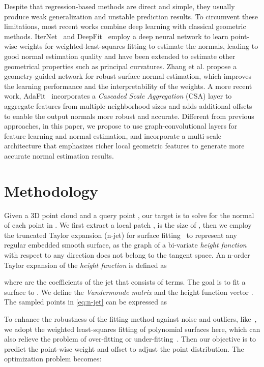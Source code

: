 \documentclass[runningheads]{llncs}
\begin{document}
 Despite that regression-based methods
are direct and simple, they usually produce weak generalization and unstable prediction results. To circumvent these limitations, most recent works combine deep learning with classical geometric methods. IterNet~\cite{lenssen2020deep} and DeepFit~\cite{ben2020deepfit} employ a deep neural network to learn point-wise weights for weighted-least-squares fitting to estimate the normals, leading to good normal estimation quality and have been extended to estimate other geometrical properties such as principal curvatures. Zhang et al. \cite{zhang2022geometry} propose a geometry-guided network for robust surface normal estimation, which improves the learning performance and the interpretability of the weights. A more recent work, AdaFit~\cite{zhu2021adafit} incorporates a \emph{Cascaded Scale Aggregation} (CSA) layer to aggregate features from multiple neighborhood sizes and adds additional offsets to enable the output normals more robust and accurate. Different from previous approaches, in this paper, we propose to use graph-convolutional layers for feature learning and normal estimation, and incorporate a multi-scale architecture that emphasizes richer local geometric features to generate more accurate normal estimation results.


\section{Methodology}\label{sec:meth}
 Given a 3D point cloud  and a query point , our target is to solve for the normal of each point in . We first extract a local patch ,  is the size of , then we employ the truncated Taylor expansion (n-jet) for surface fitting~\cite{cazals2005estimating} to represent any regular embedded smooth surface, as the graph of a bi-variate \textit{height function} with respect to any  direction does not belong to the tangent space. An n-order Taylor expansion of the \textit{height function} is defined as 

where  are the coefficients of the jet that consists of  terms. 
The goal is to fit a surface to . We define the \textit{Vandermonde matrix}  and the height function vector .
The sampled points in \cref{eq:n-jet} can be expressed as 

To enhance the robustness of the fitting method against noise and outliers, like~\cite{ben2020deepfit}, we adopt the weighted least-squares fitting of polynomial surfaces here, which can also relieve the problem of over-fitting or under-fitting~\cite{zhu2021adafit}. Then our objective is to predict the point-wise weight  and offset  to adjust the point distribution. The optimization problem becomes:
\end{document}
